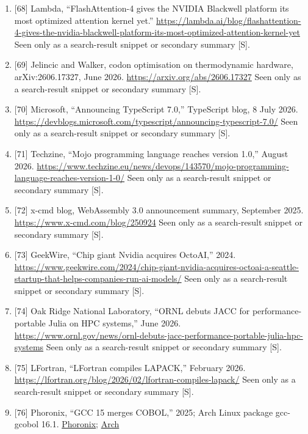 \documentclass[10pt,letterpaper]{article}
\begin{document}
\begin{enumerate}
  Seen only as a search-result snippet or secondary summary {[}S{]}.
\item
  {[}68{]} Lambda, ``FlashAttention-4 gives the NVIDIA Blackwell
  platform its most optimized attention kernel yet.''
  \url{https://lambda.ai/blog/flashattention-4-gives-the-nvidia-blackwell-platform-its-most-optimized-attention-kernel-yet}
  Seen only as a search-result snippet or secondary summary {[}S{]}.
\item
  {[}69{]} Jelincic and Walker, codon optimisation on thermodynamic
  hardware, arXiv:2606.17327, June 2026.
  \url{https://arxiv.org/abs/2606.17327} Seen only as a search-result
  snippet or secondary summary {[}S{]}.
\item
  {[}70{]} Microsoft, ``Announcing TypeScript 7.0,'' TypeScript blog, 8
  July 2026.
  \url{https://devblogs.microsoft.com/typescript/announcing-typescript-7.0/}
  Seen only as a search-result snippet or secondary summary {[}S{]}.
\item
  {[}71{]} Techzine, ``Mojo programming language reaches version 1.0,''
  August 2026.
  \url{https://www.techzine.eu/news/devops/143570/mojo-programming-language-reaches-version-1-0/}
  Seen only as a search-result snippet or secondary summary {[}S{]}.
\item
  {[}72{]} x-cmd blog, WebAssembly 3.0 announcement summary, September
  2025. \url{https://www.x-cmd.com/blog/250924} Seen only as a
  search-result snippet or secondary summary {[}S{]}.
\item
  {[}73{]} GeekWire, ``Chip giant Nvidia acquires OctoAI,'' 2024.
  \url{https://www.geekwire.com/2024/chip-giant-nvidia-acquires-octoai-a-seattle-startup-that-helps-companies-run-ai-models/}
  Seen only as a search-result snippet or secondary summary {[}S{]}.
\item
  {[}74{]} Oak Ridge National Laboratory, ``ORNL debuts JACC for
  performance-portable Julia on HPC systems,'' June 2026.
  \url{https://www.ornl.gov/news/ornl-debuts-jacc-performance-portable-julia-hpc-systems}
  Seen only as a search-result snippet or secondary summary {[}S{]}.
\item
  {[}75{]} LFortran, ``LFortran compiles LAPACK,'' February 2026.
  \url{https://lfortran.org/blog/2026/02/lfortran-compiles-lapack/} Seen
  only as a search-result snippet or secondary summary {[}S{]}.
\item
  {[}76{]} Phoronix, ``GCC 15 merges COBOL,'' 2025; Arch Linux package
  gcc-gcobol 16.1.
  \href{https://www.phoronix.com/news/GCC-15-Merges-COBOL}{Phoronix};
  \href{https://archlinux.org/packages/core/x86_64/gcc-gcobol/}{Arch}

\end{enumerate}
\end{document}
